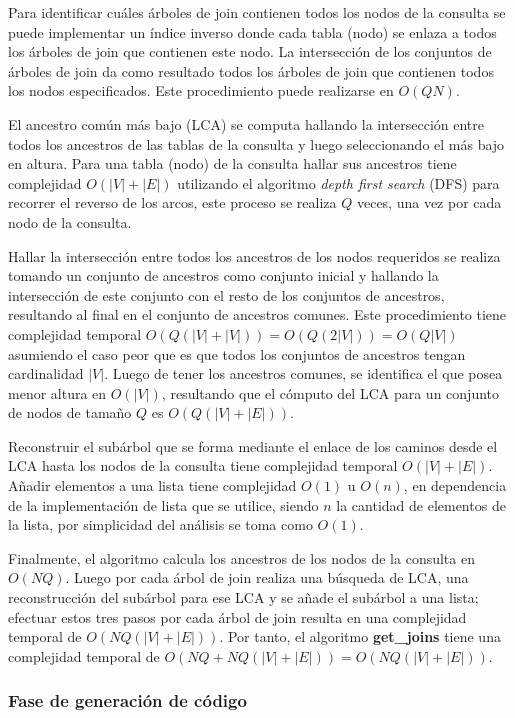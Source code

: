 Para identificar cu\'ales \'arboles de join contienen todos los nodos de la consulta se puede implementar un índice 
inverso donde cada tabla (nodo) se enlaza a todos los árboles de join que contienen 
este nodo. La intersección de los conjuntos de árboles de join da como resultado todos los árboles de join 
que contienen todos los nodos especificados. Este procedimiento puede realizarse en $O(QN)$. 

El ancestro común más bajo (LCA) se computa hallando la intersección entre todos los ancestros de las tablas de la consulta y luego 
seleccionando el m\'as bajo en altura. Para una tabla (nodo) de la consulta hallar sus ancestros 
tiene complejidad $O(|V| + |E|)$ utilizando el algoritmo \emph{depth first search} (DFS) para recorrer el reverso de los arcos, 
este proceso se realiza $Q$ veces, una vez por cada nodo de la consulta. 

Hallar la intersección 
entre todos los ancestros de los nodos requeridos se realiza tomando un conjunto de ancestros 
como conjunto inicial y hallando la intersección de este conjunto con el resto de los conjuntos de ancestros, 
resultando al final en el conjunto de ancestros comunes. Este procedimiento tiene complejidad temporal 
$O(Q(|V| + |V|)) = O(Q(2|V|)) = O(Q|V|)$ asumiendo el caso peor que es que todos los conjuntos de ancestros 
tengan cardinalidad $|V|$. Luego de tener los ancestros comunes, se identifica el que posea menor altura 
en $O(|V|)$, resultando que el cómputo del LCA para un conjunto de nodos de tamaño $Q$ es $O(Q(|V| + |E|))$.

Reconstruir el sub\'arbol que se forma mediante el enlace de los caminos desde el LCA hasta los nodos 
de la consulta tiene complejidad temporal $O(|V| + |E|)$. Añadir elementos a una lista tiene complejidad 
$O(1)$ u $O(n)$, en dependencia de la implementación de lista que se utilice, siendo $n$ la cantidad 
de elementos de la lista, por simplicidad del análisis se toma como $O(1)$.

Finalmente, el algoritmo calcula los ancestros de los nodos de la consulta en $O(NQ)$. Luego por cada \'arbol de join realiza una búsqueda de LCA, 
una reconstrucción 
del sub\'arbol para ese LCA y se añade el sub\'arbol a una lista; efectuar estos tres pasos por cada \'arbol de join resulta en una complejidad temporal de 
$O(NQ(|V| + |E|))$. 
Por tanto, el algoritmo \textbf{get\_joins} tiene una complejidad 
temporal de $O(NQ + NQ(|V| + |E|)) = O(NQ(|V| + |E|))$.


\subsubsection{Fase de generaci\'on de c\'odigo}


